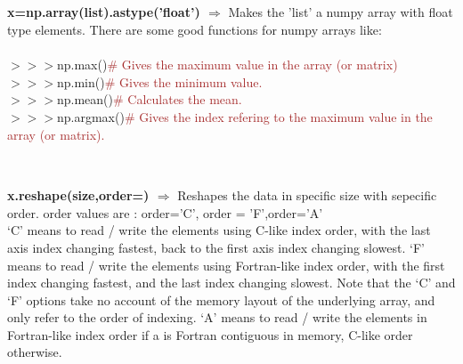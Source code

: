 \documentclass[a4paper,18pt]{article}
\begin{document}

\subsection{\colorbox {matgreen}{\color{white}{\large np.array(list).astype('float')}}}
\textbf{x=np.array(list).astype('float') $\Rightarrow$} Makes the 'list' a numpy array with float type elements. There are some good functions for numpy arrays like:\\\\

$>>>$np.max(){\textcolor{brown}{\# Gives the maximum value in the array (or matrix)}}\\

$>>>$np.min(){\textcolor{brown}{\# Gives the minimum value.}}\\

$>>>$np.mean(){\textcolor{brown}{\# Calculates the mean.}}\\

$>>>$np.argmax(){\textcolor{brown}{\# Gives the index refering to the maximum value in the array (or matrix).}}\\\\


\subsection{\colorbox {matgreen}{\color{white}{\large Reshape}}}
\textbf{x.reshape(size,order=) $\Rightarrow$} Reshapes the data in specific size with sepecific order. order values are : order='C', order = 'F',order='A'\\

 ‘C’ means to read / write the elements using C-like index order, with the last axis index changing fastest, back to the first axis index changing slowest. ‘F’ means to read / write the elements using Fortran-like index order, with the first index changing fastest, and the last index changing slowest. Note that the ‘C’ and ‘F’ options take no account of the memory layout of the underlying array, and only refer to the order of indexing. ‘A’ means to read / write the elements in Fortran-like index order if a is Fortran contiguous in memory, C-like order otherwise.\\\\
\end{document}
